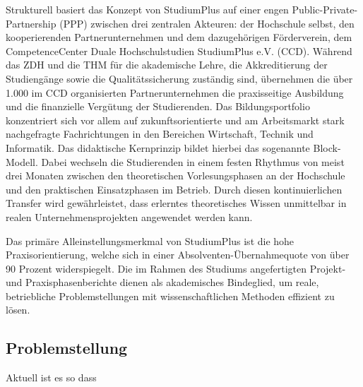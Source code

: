 \documentclass[12pt,a4paper]{scrartcl}
\begin{document}
	Strukturell basiert das Konzept von StudiumPlus auf einer engen Public-Private-Partnership (PPP) zwischen drei zentralen Akteuren: der Hochschule selbst, den kooperierenden Partnerunternehmen und dem dazugehörigen Förderverein, dem CompetenceCenter Duale Hochschulstudien StudiumPlus e.V. (CCD). Während das ZDH und die THM für die akademische Lehre, die Akkreditierung der Studiengänge sowie die Qualitätssicherung zuständig sind, übernehmen die über 1.000 im CCD organisierten Partnerunternehmen die praxisseitige Ausbildung und die finanzielle Vergütung der Studierenden.
	Das Bildungsportfolio konzentriert sich vor allem auf zukunftsorientierte und am Arbeitsmarkt stark nachgefragte Fachrichtungen in den Bereichen Wirtschaft, Technik und Informatik. Das didaktische Kernprinzip bildet hierbei das sogenannte Block-Modell. Dabei wechseln die Studierenden in einem festen Rhythmus von meist drei Monaten zwischen den theoretischen Vorlesungsphasen an der Hochschule und den praktischen Einsatzphasen im Betrieb. Durch diesen kontinuierlichen Transfer wird gewährleistet, dass erlerntes theoretisches Wissen unmittelbar in realen Unternehmensprojekten angewendet werden kann.
	
	Das primäre Alleinstellungsmerkmal von StudiumPlus ist die hohe Praxisorientierung, welche sich in einer Absolventen-Übernahmequote von über 90 Prozent widerspiegelt. Die im Rahmen des Studiums angefertigten Projekt- und Praxisphasenberichte dienen als akademisches Bindeglied, um reale, betriebliche Problemstellungen mit wissenschaftlichen Methoden effizient zu lösen. ~\cite{studiumplus2025,thm_profil}
	
	\subsection{Problemstellung}
	Aktuell ist es so dass
	
	
	
	\newpage
	
	
\end{document}
